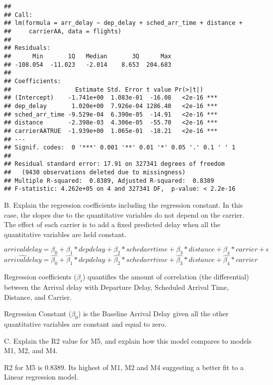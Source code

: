 \documentclass[
]{article}
\begin{document}
\begin{verbatim}
## 
## Call:
## lm(formula = arr_delay ~ dep_delay + sched_arr_time + distance + 
##     carrierAA, data = flights)
## 
## Residuals:
##      Min       1Q   Median       3Q      Max 
## -108.054  -11.023   -2.014    8.653  204.683 
## 
## Coefficients:
##                  Estimate Std. Error t value Pr(>|t|)    
## (Intercept)    -1.741e+00  1.083e-01  -16.08   <2e-16 ***
## dep_delay       1.020e+00  7.926e-04 1286.40   <2e-16 ***
## sched_arr_time -9.529e-04  6.390e-05  -14.91   <2e-16 ***
## distance       -2.398e-03  4.306e-05  -55.70   <2e-16 ***
## carrierAATRUE  -1.939e+00  1.065e-01  -18.21   <2e-16 ***
## ---
## Signif. codes:  0 '***' 0.001 '**' 0.01 '*' 0.05 '.' 0.1 ' ' 1
## 
## Residual standard error: 17.91 on 327341 degrees of freedom
##   (9430 observations deleted due to missingness)
## Multiple R-squared:  0.8389, Adjusted R-squared:  0.8389 
## F-statistic: 4.262e+05 on 4 and 327341 DF,  p-value: < 2.2e-16
\end{verbatim}

B. Explain the regression coefficients including the regression
constant. In this case, the slopes due to the quantitative variables do
not depend on the carrier. The effect of each carrier is to add a fixed
predicted delay when all the quantitative variables are held constant.

\[
arrivaldelay = \beta_{0} + \beta_{1} * depdelay + \beta_{2} * schedarrtime + \beta_{3} * distance + \beta_{4} * carrier + \epsilon
\] \[
\hat{arrivaldelay} = \hat{\beta_{0}} + \hat{\beta_{1}} * depdelay + \hat{\beta_{2}} * schedarrtime + \hat{\beta_{3}} * distance + \hat{\beta_{4}} * carrier
\]

Regression coefficients (\(\beta_{i}\)) quantifies the amount of
correlation (the differential) between the Arrival delay with Departure
Delay, Scheduled Arrival Time, Distance, and Carrier.

Regression Constant (\(\beta_{0}\)) is the Baseline Arrival Delay given
all the other quantitative variables are constant and equal to zero.

C. Explain the R2 value for M5, and explain how this model compares to
models M1, M2, and M4.

R2 for M5 is 0.8389. Its highest of M1, M2 and M4 suggesting a better
fit to a Linear regression model.
\end{document}

